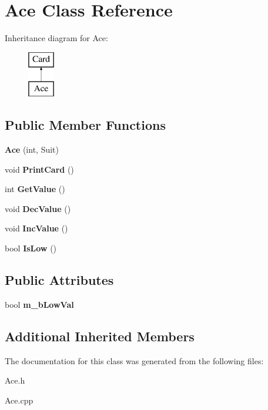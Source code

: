 \hypertarget{class_ace}{}\section{Ace Class Reference}
\label{class_ace}
Inheritance diagram for Ace\+:\begin{figure}[H]
\begin{center}
\leavevmode
\includegraphics[height=2.000000cm]{class_ace}
\end{center}
\end{figure}
\subsection*{Public Member Functions}
\begin{DoxyCompactItemize}
\item 
{\bfseries Ace} (int, Suit)\hypertarget{class_ace_a56ff024bb9b079f04cec836ac3ba389c}{}\label{class_ace_a56ff024bb9b079f04cec836ac3ba389c}

\item 
void {\bfseries Print\+Card} ()\hypertarget{class_ace_a050c43881616cd6bd2cccaf18cffca45}{}\label{class_ace_a050c43881616cd6bd2cccaf18cffca45}

\item 
int {\bfseries Get\+Value} ()\hypertarget{class_ace_adfb0f5e0a407d142b194ca3fc0c821a3}{}\label{class_ace_adfb0f5e0a407d142b194ca3fc0c821a3}

\item 
void {\bfseries Dec\+Value} ()\hypertarget{class_ace_ababf90507705afe181768744c2cf7831}{}\label{class_ace_ababf90507705afe181768744c2cf7831}

\item 
void {\bfseries Inc\+Value} ()\hypertarget{class_ace_ac6e447fe80821643237c71f92e73adcd}{}\label{class_ace_ac6e447fe80821643237c71f92e73adcd}

\item 
bool {\bfseries Is\+Low} ()\hypertarget{class_ace_a8aa71eb43584d2e6cf56809d2b13b562}{}\label{class_ace_a8aa71eb43584d2e6cf56809d2b13b562}

\end{DoxyCompactItemize}
\subsection*{Public Attributes}
\begin{DoxyCompactItemize}
\item 
bool {\bfseries m\+\_\+b\+Low\+Val}\hypertarget{class_ace_a984604c0e554b5fd3e77e12082c25fd9}{}\label{class_ace_a984604c0e554b5fd3e77e12082c25fd9}

\end{DoxyCompactItemize}
\subsection*{Additional Inherited Members}


The documentation for this class was generated from the following files\+:\begin{DoxyCompactItemize}
\item 
Ace.\+h\item 
Ace.\+cpp\end{DoxyCompactItemize}

